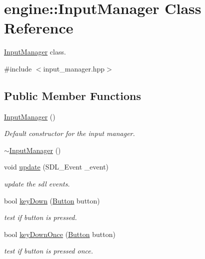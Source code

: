 \hypertarget{classengine_1_1_input_manager}{}\section{engine\+:\+:Input\+Manager Class Reference}
\label{classengine_1_1_input_manager}


\hyperlink{classengine_1_1_input_manager}{Input\+Manager} class.  




{\ttfamily \#include $<$input\+\_\+manager.\+hpp$>$}

\subsection*{Public Member Functions}
\begin{DoxyCompactItemize}
\item 
\hyperlink{classengine_1_1_input_manager_a8be46886da639b26d67181c29dab6d6c}{Input\+Manager} ()
\begin{DoxyCompactList}\small\item\em Default constructor for the input manager. \end{DoxyCompactList}\item 
\hyperlink{classengine_1_1_input_manager_af518290877dd183606709d5852db5491}{$\sim$\+Input\+Manager} ()
\item 
void \hyperlink{classengine_1_1_input_manager_af7fdc23fa8b7bfa3651aa58f476b1a70}{update} (S\+D\+L\+\_\+\+Event \+\_\+event)
\begin{DoxyCompactList}\small\item\em update the sdl events. \end{DoxyCompactList}\item 
bool \hyperlink{classengine_1_1_input_manager_a3a25017b57aaa5ce61801158d852d1cb}{key\+Down} (\hyperlink{namespaceengine_ae215983ad6dd0b5102ec75314b5afe2d}{Button} button)
\begin{DoxyCompactList}\small\item\em test if button is pressed. \end{DoxyCompactList}\item 
bool \hyperlink{classengine_1_1_input_manager_ad82059c91ae6f43a6a5d5cd211b79c54}{key\+Down\+Once} (\hyperlink{namespaceengine_ae215983ad6dd0b5102ec75314b5afe2d}{Button} button)
\begin{DoxyCompactList}\small\item\em test if button is pressed once. \end{DoxyCompactList}\item 

\end{DoxyCompactItemize}
